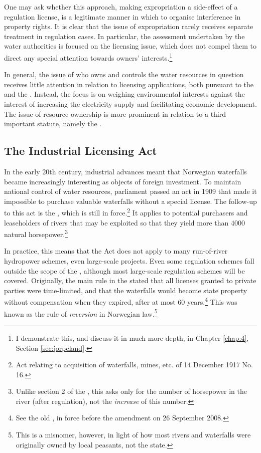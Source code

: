 One may ask whether this approach, making expropriation a side-effect of a regulation license, is a legitimate manner in which to organise interference in property rights. It is clear that the issue of expropriation rarely receives separate treatment in regulation cases. In particular, the assessment undertaken by the water authorities is focused on the licensing issue, which does not compel them to direct any special attention towards owners' interests.\footnote{I demonstrate this, and discuss it in much more depth, in Chapter \ref{chap:4}, Section \ref{sec:jorpeland}.}

In general, the issue of who owns and controls the water resources in question receives little attention in relation to licensing applications, both pursuant to the \cite{wra17} and the \cite{wra00}. Instead, the focus is on weighing environmental interests against the interest of increasing the electricity supply and facilitating economic development. The issue of resource ownership is more prominent in relation to a third important statute, namely the \cite{ica17}.

\subsection{The Industrial Licensing Act}\label{sec:ica17}

In the early 20th century, industrial advances meant that Norwegian waterfalls became increasingly interesting as objects of foreign investment. To maintain national control of water resources, parliament passed an act in 1909 that made it impossible to purchase valuable waterfalls without a special license. The follow-up to this act is the \cite{ica17}, which is still in force.\footnote{Act relating to acquisition of waterfalls, mines, etc. of 14 December 1917 No. 16.} It applies to potential purchasers and leaseholders of rivers that may be exploited so that they yield more than 4000 natural horsepower.\footnote{Unlike section 2 of the \cite{wra17}, this asks only for the number of horsepower in the river (after regulation), not the {\it increase} of this number.}

In practice, this means that the Act does not apply to many run-of-river hydropower schemes, even large-scale projects. Even some regulation schemes fall outside the scope of the \cite{ica17}, although most large-scale regulation schemes will be covered. Originally, the main rule in the \cite{ica17} stated that all licenses granted to private parties were time-limited, and that the waterfalls would become state property without compensation when they expired, after at most 60 years.\footnote{See the old \cite[2]{ica17}, in force before the amendment on 26 September 2008.} This was known as the rule of {\it reversion} in Norwegian law.\footnote{This is a misnomer, however, in light of how most rivers and waterfalls were originally owned by local peasants, not the state.}

